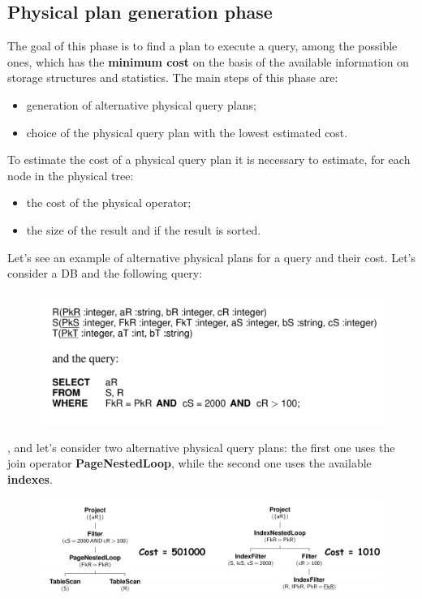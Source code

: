 \subsection{Physical plan generation phase}
The goal of this phase is to find a plan to execute a query, among the possible ones, which has the \textbf{minimum cost} on the basis of the available information on storage structures and statistics. The main steps of this phase are:

\begin{itemize}
    \item generation of alternative physical query plans;
    \item choice of the physical query plan with the lowest estimated cost.
\end{itemize}

To estimate the cost of a physical query plan it is necessary to estimate, for each node in the physical tree:

\begin{itemize}
    \item the cost of the physical operator;
    \item the size of the result and if the result is sorted.
\end{itemize}
 
Let's see an example of alternative physical plans for a query and their
cost. Let's consider a DB and the following query:

\begin{figure}[H]
		\centering
		\includegraphics[scale = 0.7]{img/queop6.jpg}
		\label{queop4}
\end{figure}

, and let's consider two alternative physical query plans: the first one uses the join operator \textbf{PageNestedLoop}, while the second one uses the available \textbf{indexes}.

\begin{figure}[H]
		\centering
		\includegraphics[scale = 0.7]{img/queop7.jpg}
		\label{queop4}
\end{figure}

